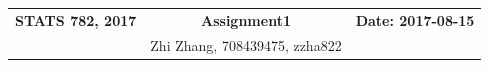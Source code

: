\documentclass[11pt]{report}
\theoremstyle{definition}
\theoremstyle{remark}
\begin{document}
\setlength\extrarowheight{3pt}
\begin{tabular*}{\textwidth}{ @{} l @{\extracolsep\fill} c @{\extracolsep\fill} r @{}}
  \hline
  \textbf{STATS 782, 2017} & \textbf{Assignment1} & \textbf{Date: 2017-08-15} \\
   & Zhi Zhang, 708439475, zzha822 & \\
  \hline
\end{tabular*}
\end{document}
